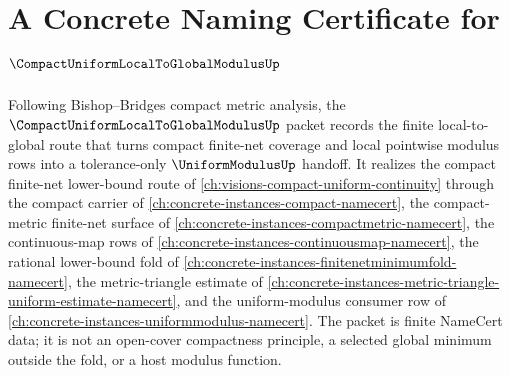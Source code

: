 \chapter{A Concrete Naming Certificate for $\CompactUniformLocalToGlobalModulusUp$}
\label{ch:concrete-instances-compact-uniform-local-to-global-modulus-namecert}

Following Bishop--Bridges compact metric analysis, the $\CompactUniformLocalToGlobalModulusUp$ packet records the finite local-to-global route that turns compact finite-net coverage and local pointwise modulus rows into a tolerance-only $\UniformModulusUp$ handoff. It realizes the compact finite-net lower-bound route of \autoref{ch:visions-compact-uniform-continuity} through the compact carrier of \autoref{ch:concrete-instances-compact-namecert}, the compact-metric finite-net surface of \autoref{ch:concrete-instances-compactmetric-namecert}, the continuous-map rows of \autoref{ch:concrete-instances-continuousmap-namecert}, the rational lower-bound fold of \autoref{ch:concrete-instances-finitenetminimumfold-namecert}, the metric-triangle estimate of \autoref{ch:concrete-instances-metric-triangle-uniform-estimate-namecert}, and the uniform-modulus consumer row of \autoref{ch:concrete-instances-uniformmodulus-namecert}. The packet is finite NameCert data; it is not an open-cover compactness principle, a selected global minimum outside the fold, or a host modulus function.

